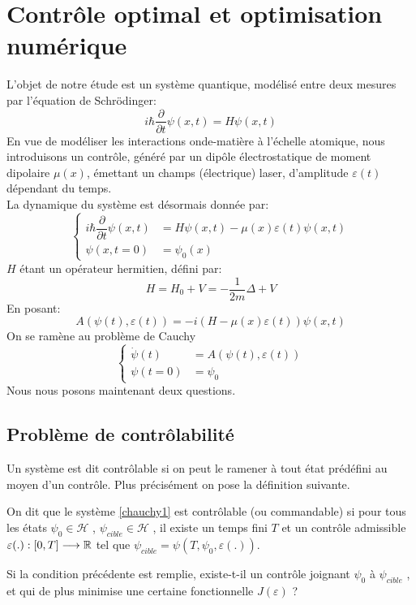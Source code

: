 \section*{Contrôle optimal et optimisation numérique}
L'objet de notre étude est un système quantique, modélisé entre deux mesures par l'équation de Schrödinger:
\begin{equation} \label{schrodinger}
i \hbar \dfrac{\partial }{\partial t} \psi (x,t) = H\psi (x,t)
\end{equation}
En vue de modéliser les interactions onde-matière à l'échelle atomique, nous introduisons un contrôle, généré par un dipôle électrostatique de moment dipolaire $\mu (x)$, émettant un champs (électrique) laser, d'amplitude $\varepsilon (t)$ dépendant du temps.\\
La dynamique du système est désormais donnée par:
\begin{equation} \label{eq1}
\begin{cases}
i \hbar \dfrac{\partial }{\partial t} \psi (x,t) &= H\psi (x,t)-\mu(x)\varepsilon(t)\psi (x,t) \\
\psi (x,t=0) &= \psi_0(x)
\end{cases}
\end{equation}
$H$ étant un opérateur hermitien, défini par:
$$
H = H_0 + V = -\dfrac{1}{2m} \varDelta + V
$$
En posant:
\begin{equation}
A(\psi(t),\varepsilon(t))= -i(H-\mu(x)\varepsilon(t))\psi (x,t)
\end{equation}
On se ramène au problème de Cauchy
\begin{equation} \label{chauchy1}
\begin{cases}
\dot{\psi}(t) &= A(\psi(t),\varepsilon(t))\\
\psi (t=0) &= \psi_0
\end{cases}
\end{equation}
Nous nous posons maintenant deux questions.
\subsection*{Problème de contrôlabilité}
Un système est dit contrôlable si on peut le ramener à tout état prédéfini au moyen d’un contrôle. Plus précisément on pose la définition suivante.
\begin{dfn}
On dit que le système \eqref{chauchy1} est contrôlable (ou commandable) si pour tous les états $\psi_0 \in \mathcal{H}$ , $\psi_{cible} \in \mathcal{H}$ , il existe un temps fini $T$ et un contrôle admissible $\varepsilon(.) : [0, T] \longrightarrow \mathbb R$ tel que $\psi_{cible} = \psi(T, \psi_0, \varepsilon(.))$.
\end{dfn}
Si la condition précédente est remplie, existe-t-il un contrôle joignant $\psi_0$ à $\psi_{cible}$ , et qui de plus
minimise une certaine fonctionnelle $J(\varepsilon)$ ?
